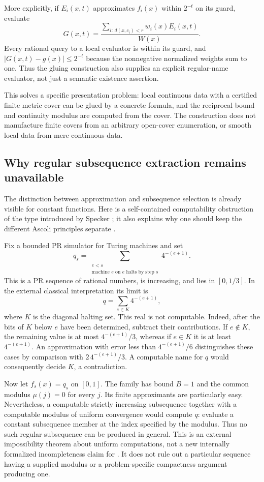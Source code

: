 More explicitly, if $E_i(x,t)$ approximates $f_i(x)$ within $2^{-t}$
on its guard, evaluate
\[
 G(x,t)=\frac{\sum_{i:\,d(x,c_i)<r}w_i(x)E_i(x,t)}{W(x)}.
\]
Every rational query to a local evaluator is within its guard, and
$|G(x,t)-g(x)|\le2^{-t}$ because the nonnegative normalized weights
sum to one.  Thus the gluing construction also supplies an explicit
regular-name evaluator, not just a semantic existence assertion.

This solves a specific presentation problem: local continuous data
with a certified finite metric cover can be glued by a concrete
formula, and the reciprocal bound and continuity modulus are computed
from the cover.  The construction does not manufacture finite covers
from an arbitrary open-cover enumeration, or smooth local data from
mere continuous data.

\subsection{Why regular subsequence extraction remains unavailable}

The distinction between approximation and subsequence selection is
already visible for constant functions.  Here is a self-contained
computability obstruction of the type introduced by Specker
\cite{Specker1949}; it also explains why one should keep the different
Ascoli principles separate \cite{Kreuzer2014}.

Fix a bounded PR simulator for Turing machines and set
\[
 q_s=\sum_{\substack{e<s\\ \text{machine }e\text{ on }e
                      \text{ halts by step }s}}4^{-(e+1)}.
\]
This is a PR sequence of rational numbers, is increasing, and lies in
$[0,1/3]$.  In the external classical interpretation its limit is
\[
 q=\sum_{e\in K}4^{-(e+1)},
\]
where $K$ is the diagonal halting set.  This real is not computable.
Indeed, after the bits of $K$ below $e$ have been determined, subtract
their contributions.  If $e\notin K$, the remaining value is at most
$4^{-(e+1)}/3$, whereas if $e\in K$ it is at least $4^{-(e+1)}$.
An approximation with error less than $4^{-(e+1)}/6$ distinguishes
these cases by comparison with $2\,4^{-(e+1)}/3$.  A computable name
for $q$ would consequently decide $K$, a contradiction.

Now let $f_s(x)=q_s$ on $[0,1]$.  The family has bound $B=1$ and the
common modulus $\mu(j)=0$ for every $j$.  Its finite approximants are
particularly easy.  Nevertheless, a computable strictly increasing
subsequence together with a computable modulus of uniform convergence
would compute $q$: evaluate a constant subsequence member at the index
specified by the modulus.  Thus no such regular subsequence can be
produced in general.  This is an external impossibility theorem about
uniform computations, not a new internally formalized incompleteness
claim for \ipra.  It does not rule out a particular sequence having a
supplied modulus or a problem-specific compactness argument producing
one.

